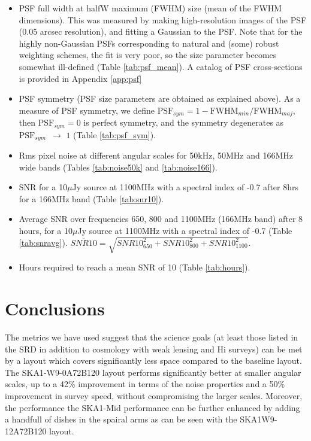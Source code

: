 \documentclass[sfheadings,a4paper,times,9pt,floats,floatfix]{article}
\begin{document}
\begin{itemize}
 \item PSF full width at halfW maximum (FWHM) size (mean of the FWHM dimensions). This was measured by making high-resolution
images of the PSF (0.05 arcsec
resolution), and fitting a Gaussian to the PSF. Note that for the highly non-Gaussian PSFs corresponding to natural and (some)
robust weighting schemes, the fit is very poor, so the size parameter becomes somewhat ill-defined (Table \ref{tab:psf_mean}).
A catalog of PSF cross-sections is provided in Appendix \ref{app:psf}

 \item PSF symmetry (PSF size parameters are obtained as explained above). As a measure of PSF symmetry, we define 
$\text{PSF}_{sym}=1-\text{FWHM}_{min}/\text{FWHM}_{maj}$, then $\text{PSF}_{sym} = 0$ is perfect symmetry, and the symmetry
degenerates as $\text{PSF}_{sym}\,\,\, \rightarrow\,\,1$ (Table \ref{tab:psf_sym}).

 \item Rms pixel noise at different angular scales for 50kHz, 50MHz and 166MHz wide bands (Tables \ref{tab:noise50k} and
\ref{tab:noise166}).
 
 \item SNR for a 10$\mu$Jy source at 1100MHz with a spectral index of -0.7 after 8hrs for a 166MHz band (Table \ref{tab:snr10}).
 \item Average SNR over frequencies 650, 800 and 1100MHz (166MHz band)
   after 8 hours, for a 10$\mu$Jy source at 1100MHz
with a spectral index of -0.7 (Table \ref{tab:snravg}). {$\overline{SNR10}=\sqrt{SNR10_{650}^2 + SNR10_{800}^2 +
SNR10_{1100}^2}$}.
 \item Hours required to reach a mean SNR of 10 (Table \ref{tab:hours}).
\end{itemize}








\newpage
\section{Conclusions}\label{sec:conclusion}
The metrics we have used suggest that the science goals (at least those listed in the SRD in addition to cosmology with weak
lensing and H{\sc i} surveys) can be met by a layout which covers significantly less space compared to the baseline layout. The
SKA1-W9-0A72B120 layout performs significantly better at smaller angular scales, up to a 42\% improvement in terms of the noise
properties and a 50\% improvement in survey speed, without compromising the larger scales. Moreover, the performance the
SKA1-Mid performance can be further enhanced by adding a handfull of dishes in the spairal arms as can be seen
with the SKA1W9-12A72B120 layout.
\end{document}

